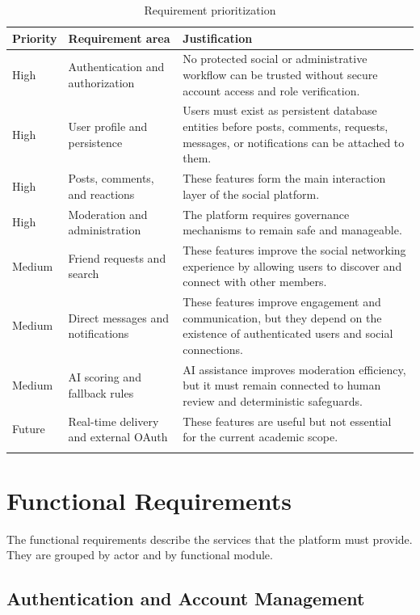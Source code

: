 \begin{longtable}{|m{3.2cm}|m{5.3cm}|m{6.2cm}|}
\hline
\textbf{Priority} & \textbf{Requirement area} & \textbf{Justification} \\
\hline
High & Authentication and authorization & No protected social or administrative workflow can be trusted without secure account access and role verification. \\
\hline
High & User profile and persistence & Users must exist as persistent database entities before posts, comments, requests, messages, or notifications can be attached to them. \\
\hline
High & Posts, comments, and reactions & These features form the main interaction layer of the social platform. \\
\hline
High & Moderation and administration & The platform requires governance mechanisms to remain safe and manageable. \\
\hline
Medium & Friend requests and search & These features improve the social networking experience by allowing users to discover and connect with other members. \\
\hline
Medium & Direct messages and notifications & These features improve engagement and communication, but they depend on the existence of authenticated users and social connections. \\
\hline
Medium & AI scoring and fallback rules & AI assistance improves moderation efficiency, but it must remain connected to human review and deterministic safeguards. \\
\hline
Future & Real-time delivery and external OAuth & These features are useful but not essential for the current academic scope. \\
\hline
\caption{Requirement prioritization}\\
\end{longtable}

\section{Functional Requirements}

The functional requirements describe the services that the platform must provide. They are grouped by actor and by functional module.

\subsection{Authentication and Account Management}

